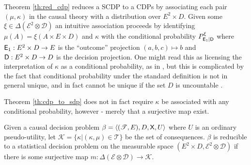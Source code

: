 Theorem \ref{th:red_cdp} reduces a SCDP to a CDPs by associating each pair $(\mu,\kappa)$ in the causal theory with a distribution over $E^2\times D$. Given some $\xi\in \Delta(\mathcal{E}^2\otimes \mathcal{D})$ an intuitive association proceeds by identifying $\mu(A)=\xi(A\times E\times D)$ and $\kappa$ with the conditional probability $P^\xi_{\mathsf{E}_1|\mathsf{D}}$ where $\mathsf{E}_1:E^2\times D\to E$ is the ``outcome'' projection $(a,b,c)\mapsto b$ and $\mathsf{D}:E^2\times D\to D$ is the decision projection. One might read this as licensing the interpretation of $\kappa$ as a conditional probability, as in \cite{dawid_beware_2010}, but this is complicated by the fact that conditional probability under the standard definition is not in general unique, and in fact cannot be unique if the set $D$ is uncountable \cite{hajek_what_2003}. 

Theorem \ref{th:cdp_to_sdp} does not in fact require $\kappa$ be associated with any conditional probability, however - merely that a surjective map exist.

\begin{theorem}\label{th:red_cdp}
Given a causal decision problem $\beta=\langle (\mathscr{T},E),D,\mathsf{X},U\rangle$ where $U$ is an ordinary pseudo-utility, let $\mathscr{K}=\{\kappa|(\kappa,\mu)\in \mathscr{T}\}$ be the set of consequences. $\beta$ is reducible to a statistical decision problem on the measurable space $(E^2\times D,\mathcal{E}^2\otimes \mathcal{D})$ if there is some surjective map $m:\Delta(\mathcal{E}\otimes\mathcal{D})\to \mathscr{K}$.
\end{theorem}

